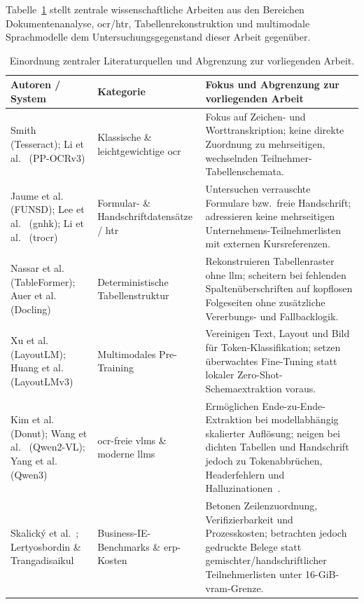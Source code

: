 Tabelle~\ref{tab:forschungsstand} stellt zentrale wissenschaftliche Arbeiten aus den Bereichen Dokumentenanalyse, \ac{ocr}/\ac{htr}, Tabellenrekonstruktion und multimodale Sprachmodelle dem Untersuchungsgegenstand dieser Arbeit gegenüber.

\begin{table}[htbp]
  \centering
  \caption[Einordnung zentraler Literaturquellen]{Einordnung zentraler Literaturquellen und Abgrenzung zur vorliegenden Arbeit.}
  \label{tab:forschungsstand}
  \footnotesize
  \begin{tabularx}{\textwidth}{@{}>{\raggedright\arraybackslash}p{} >{\raggedright\arraybackslash}p{} >{\raggedright\arraybackslash}X@{}}
    \toprule
    \textbf{Autoren / System} & \textbf{Kategorie} & \textbf{Fokus und Abgrenzung zur vorliegenden Arbeit} \\
    \midrule
    Smith~\cite{Smith2007Tesseract} (Tesseract); Li et al.~\cite{Li2022PPOCRv3} (PP-OCRv3) & Klassische \& leichtgewichtige \ac{ocr} & Fokus auf Zeichen- und Worttranskription; keine direkte Zuordnung zu mehrseitigen, wechselnden Teilnehmer-Tabellenschemata. \\
    \addlinespace[3pt]
    Jaume et al.~\cite{Jaume2019FUNSD} (FUNSD); Lee et al.~\cite{Lee2021GNHK} (\ac{gnhk}); Li et al.~\cite{Li2023TrOCR} (\ac{trocr}) & Formular- \& Handschriftdatensätze / \ac{htr} & Untersuchen verrauschte Formulare bzw.\ freie Handschrift; adressieren keine mehrseitigen Unternehmens-Teilnehmerlisten mit externen Kursreferenzen. \\
    \addlinespace[3pt]
    Nassar et al.~\cite{Nassar2022TableFormer} (TableFormer); Auer et al.~\cite{Auer2024DoclingSelection} (Docling) & Deterministische Tabellenstruktur & Rekonstruieren Tabellenraster ohne \ac{llm}; scheitern bei fehlenden Spaltenüberschriften auf kopflosen Folgeseiten ohne zusätzliche Vererbungs- und Fallbacklogik. \\
    \addlinespace[3pt]
    Xu et al.~\cite{Xu2020LayoutLM} (LayoutLM); Huang et al.~\cite{Huang2022LayoutLMv3} (LayoutLMv3) & Multimodales Pre-Training & Vereinigen Text, Layout und Bild für Token-Klassifikation; setzen überwachtes Fine-Tuning statt lokaler Zero-Shot-Schemaextraktion voraus. \\
    \addlinespace[3pt]
    Kim et al.~\cite{Kim2022Donut} (Donut); Wang et al.~\cite{Wang2024Qwen2VL} (Qwen2-VL); Yang et al.~\cite{Yang2025Qwen3} (Qwen3) & \ac{ocr}-freie \acp{vlm} \& moderne \acp{llm} & Ermöglichen Ende-zu-Ende-Extraktion bei modellabhängig skalierter Auflösung; neigen bei dichten Tabellen und Handschrift jedoch zu Tokenabbrüchen, Headerfehlern und Halluzinationen~\cite{Fu2025OCRBenchV2,Huang2024Hallucination}. \\
    \addlinespace[3pt]
    Skalický et al.~\cite{Skalicky2022Benchmarks}; Lertyosbordin \& Trangadisaikul~\cite{Lertyosbordin2026ERP} & Business-IE-Benchmarks \& \ac{erp}-Kosten & Betonen Zeilenzuordnung, Verifizierbarkeit und Prozesskosten; betrachten jedoch gedruckte Belege statt gemischter/handschriftlicher Teilnehmerlisten unter \mbox{16-GiB}-\ac{vram}-Grenze. \\
    \bottomrule
  \end{tabularx}
\end{table}

